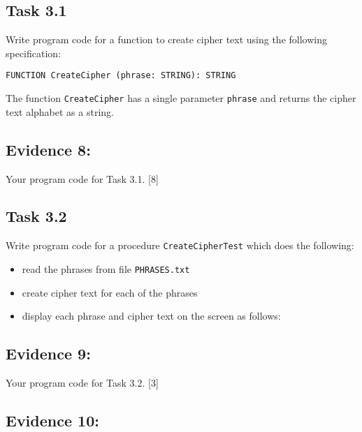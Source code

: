 \subsection*{Task 3.1 }

Write program code for a function to create cipher text using the
following specification: 
\noindent \begin{center}
\texttt{FUNCTION CreateCipher (phrase: STRING): STRING }
\par\end{center}

The function \texttt{CreateCipher} has a single parameter \texttt{phrase}
and returns the cipher text alphabet as a string. 

\subsection*{Evidence 8: }

Your program code for Task 3.1. \hfill{}{[}8{]}

\subsection*{Task 3.2 }

Write program code for a procedure \texttt{CreateCipherTest} which
does the following:
\begin{itemize}
\item read the phrases from file \texttt{PHRASES.txt} 
\item create cipher text for each of the phrases 
\item display each phrase and cipher text on the screen as follows: 

\noindent{}
\end{itemize}

\subsection*{Evidence 9: }

Your program code for Task 3.2. \hfill{}{[}3{]}

\subsection*{Evidence 10: }

